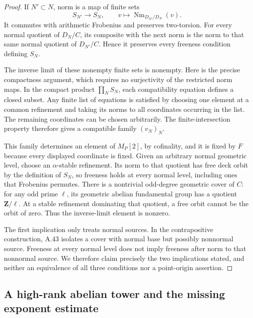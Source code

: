 \documentclass[11pt]{article}
\begin{document}
\begin{proof}
If $N'\subset N$, norm is a map of finite sets
\[
        S_{N'}\longrightarrow S_N,
        \qquad v\longmapsto\operatorname{Nm}_{D_{N'}/D_N}(v).
\]
It commutes with arithmetic Frobenius and preserves
two-torsion. For every normal quotient of $D_N/C$, its
composite with the next norm is the norm to that same normal
quotient of $D_{N'}/C$. Hence it preserves every freeness
condition defining $S_N$.

The inverse limit of these nonempty finite sets is nonempty.
Here is the precise compactness argument, which requires no
surjectivity of the restricted norm maps. In the compact
product $\prod_N S_N$, each compatibility equation defines a
closed subset. Any finite list of equations is satisfied by
choosing one element at a common refinement and taking its
norms to all coordinates occurring in the list. The remaining
coordinates can be chosen arbitrarily. The finite-intersection
property therefore gives a compatible family $(v_N)_N$.

This family determines an element of $M_P[2]$, by cofinality,
and it is fixed by $F$ because every displayed coordinate is
fixed. Given an arbitrary normal geometric level, choose an
$\alpha$-stable refinement. Its norm to that quotient has
free deck orbit by the definition of $S_N$, so freeness holds
at every normal level, including ones that Frobenius permutes.
There is a nontrivial odd-degree geometric cover of $C$:
for any odd prime $\ell$, its geometric abelian fundamental
group has a quotient $\mathbf Z/\ell$. At a stable refinement
dominating that quotient, a free orbit cannot be the orbit
of zero. Thus the inverse-limit element is nonzero.

The first implication only treats normal sources. In the
contrapositive construction, A.43 isolates a cover with
normal base but possibly nonnormal source. Freeness at every
normal level does not imply freeness after norm to that
nonnormal source. We therefore claim precisely the two
implications stated, and neither an equivalence of all three
conditions nor a point-origin assertion.
\end{proof}

\subsection{A high-rank abelian tower and the missing exponent estimate}
\end{document}
